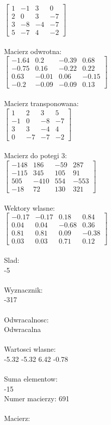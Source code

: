 \documentclass[a4paper,12pt]{article}
\begin{document}
$\begin{bmatrix} 1&-1&3&0\\2&0&3&-7\\3&-8&-4&-7\\5&-7&4&-2 \end{bmatrix}$
\\
\\
Macierz odwrotna:\\

$\begin{bmatrix} -1.64&0.2&-0.39&0.68\\-0.75&0.16&-0.22&0.22\\0.63&-0.01&0.06&-0.15\\-0.2&-0.09&-0.09&0.13 \end{bmatrix}$
\\
\\
Macierz transponowana:\\

$\begin{bmatrix} 1&2&3&5\\-1&0&-8&-7\\3&3&-4&4\\0&-7&-7&-2 \end{bmatrix}$
\\
\\
Macierz do potegi 3:\\

$\begin{bmatrix} -148&186&-59&287\\-115&345&105&91\\505&-410&554&-553\\-18&72&130&321 \end{bmatrix}$
\\
\\
Wektory wlasne:\\

$\begin{bmatrix} -0.17&-0.17&0.18&0.84\\0.04&0.04&-0.68&0.36\\0.81&0.81&0.09&-0.38\\0.03&0.03&0.71&0.12 \end{bmatrix}$
\\
\\
Slad:\\
-5
\\
\\
Wyznacznik:\\
-317
\\
\\
Odwracalnosc:\\
Odwracalna
\\
\\
Wartosci wlasne:\\
-5.32 -5.32 6.42 -0.78
\\
\\
Suma elementow:\\
-15
\\
\newpage
Numer macierzy:
691
\\
\\
Macierz:\\
\end{document}
